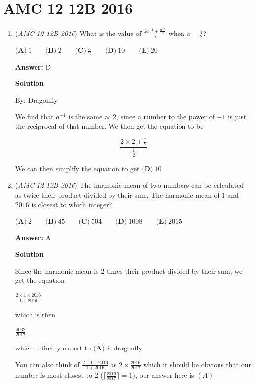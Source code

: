 \section{AMC 12 12B 2016}
        \begin{enumerate}
        	\item (\textit{AMC 12 12B 2016}) What is the value of $\frac{2a^{-1}+\frac{a^{-1}}{2}}{a}$ when $a= \frac{1}{2}$?


 $\textbf{(A)}\ 1\qquad\textbf{(B)}\ 2\qquad\textbf{(C)}\ \frac{5}{2}\qquad\textbf{(D)}\ 10\qquad\textbf{(E)}\ 20$

 \textbf{Answer: }D



\textbf{Solution}

By: Dragonfly

 We find that $a^{-1}$ is the same as $2$, since a number to the power of $-1$ is just the reciprocal of that number. We then get the equation to be

 
 \[\frac{2\times2+\frac{2}{2}}{\frac{1}{2}}\]

 We can then simplify the equation to get $\boxed{\textbf{(D)}\ 10}$



	\item (\textit{AMC 12 12B 2016}) The harmonic mean of two numbers can be calculated as twice their product divided by their sum. The harmonic mean of $1$ and $2016$ is closest to which integer?


 $\textbf{(A)}\ 2 \qquad \textbf{(B)}\ 45 \qquad \textbf{(C)}\ 504 \qquad \textbf{(D)}\ 1008 \qquad \textbf{(E)}\ 2015$

 \textbf{Answer: }A



\textbf{Solution}

Since the harmonic mean is $2$ times their product divided by their sum, we get the equation

 $\frac{2\times1\times2016}{1+2016}$

 which is then

 $\frac{4032}{2017}$

 which is finally closest to $\boxed{\textbf{(A)}\ 2}$.-dragonfly

 You can also think of $\frac{2\times1\times2016}{1+2016}$ as $2\times\frac{2016}{2017}$ which it should be obvious that our number is most closest to 2 ($\lceil\frac{2016}{2017}\rceil=1$), our answer here is $\boxed{(A)}$




\end{enumerate}
